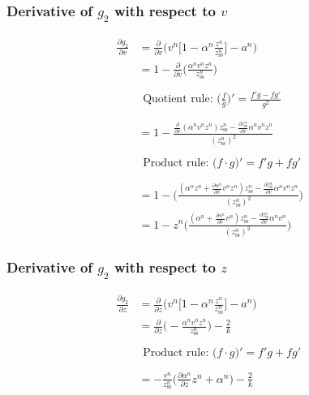 \documentclass{article}
\begin{document}
\subsubsection*{Derivative of $g_2$ with respect to $v$}
\begin{equation}
    \begin{aligned}
        \frac{\partial g_2}{\partial v} &= \frac{\partial}{\partial v} \Bigg(v^n\bigg[1-\alpha^n\frac{z^n}{z_\text{ss}^n}\bigg]-a^n\Bigg)\\
        &= 1 - \frac{\partial}{\partial v}\Bigg(\frac{\alpha^nv^nz^n}{z_\text{ss}^n}\Bigg)\\
        &\\
        &\begin{gathered}
        \text{Quotient rule: }\boxed{\Bigg(\frac{f}{g}\Bigg)' = \frac{f'g - fg'}{g^2}}
        \end{gathered}
        \\
        &\\
        &= 1 - \frac{\frac{\partial}{\partial v}(\alpha^n v^n z^n)z_\text{ss}^n - \frac{\partial z_\text{ss}^n}{\partial v}\alpha^n v^n z^n}{(z_\text{ss}^n)^2}
        \\
        &\\
        &\begin{gathered}
        \text{Product rule: }\boxed{\big(f\cdot g\big)' = f'g + fg'}
        \end{gathered}
        \\
        &\\
        &= 1-\Bigg(\frac{(\alpha^nz^n + \frac{\partial \alpha^n}{\partial v}v^nz^n)z_\text{ss}^n - \frac{\partial z_\text{ss}^n}{\partial v}\alpha^n v^nz^n}{(z_\text{ss}^n)^2}\Bigg)\\
        &= 1-z^n\Bigg(\frac{(\alpha^n+\frac{\partial \alpha^n}{\partial v}v^n)z_\text{ss}^n - \frac{\partial z_\text{ss}^n}{\partial v}\alpha^n v^n}{(z_\text{ss}^n)^2}\Bigg)
    \end{aligned}
\end{equation}
\subsubsection{Derivative of $g_2$ with respect to $z$}
\begin{equation}
    \begin{aligned}
        \frac{\partial g_2}{\partial z} &= \frac{\partial}{\partial z} \Bigg(v^n\bigg[1-\alpha^n\frac{z^n}{z_\text{ss}^n}\bigg] - a^n\Bigg)\\
        &= \frac{\partial}{\partial z}\Bigg(-\frac{\alpha^nv^nz^n}{z_\text{ss}^n}\Bigg)-\frac{2}{k}
        \\
        &\\
        &\begin{gathered}
        \text{Product rule: }\boxed{\big(f\cdot g\big)' = f'g + fg'}
        \end{gathered}
        \\
        &\\
        & = -\frac{v^n}{z_\text{ss}^n}\bigg(\frac{\partial \alpha^n}{\partial z}z^n + \alpha^n\bigg)-\frac{2}{k}
    \end{aligned}
\end{equation}
\end{document}

